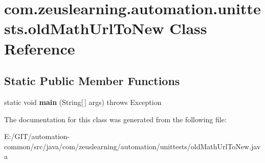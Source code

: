 \hypertarget{classcom_1_1zeuslearning_1_1automation_1_1unittests_1_1oldMathUrlToNew}{}\section{com.\+zeuslearning.\+automation.\+unittests.\+old\+Math\+Url\+To\+New Class Reference}
\label{classcom_1_1zeuslearning_1_1automation_1_1unittests_1_1oldMathUrlToNew}
\subsection*{Static Public Member Functions}
\begin{DoxyCompactItemize}
\item 
\hypertarget{classcom_1_1zeuslearning_1_1automation_1_1unittests_1_1oldMathUrlToNew_aee59221770bafb2b74fde90c4c359d73}{}\label{classcom_1_1zeuslearning_1_1automation_1_1unittests_1_1oldMathUrlToNew_aee59221770bafb2b74fde90c4c359d73} 
static void {\bfseries main} (String\mbox{[}$\,$\mbox{]} args)  throws Exception 
\end{DoxyCompactItemize}


The documentation for this class was generated from the following file\+:\begin{DoxyCompactItemize}
\item 
E\+:/\+G\+I\+T/automation-\/common/src/java/com/zeuslearning/automation/unittests/old\+Math\+Url\+To\+New.\+java\end{DoxyCompactItemize}
